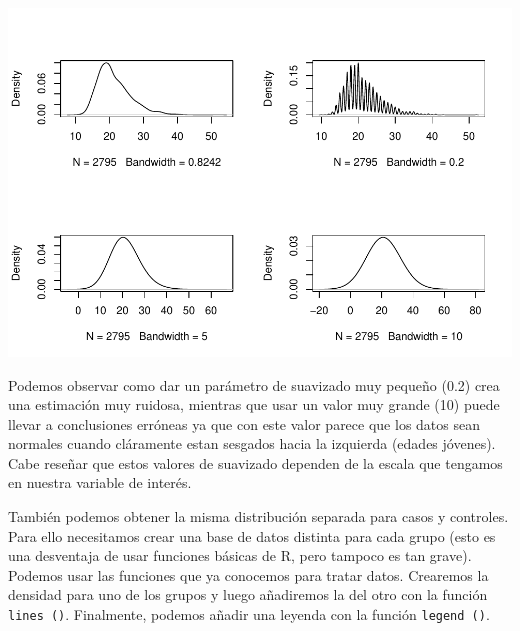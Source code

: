 \documentclass[
]{book}
\begin{document}
\includegraphics{fig/unnamed-chunk-83-1.pdf}

Podemos observar como dar un parámetro de suavizado muy pequeño (0.2) crea una estimación muy ruidosa, mientras que usar un valor muy grande (10) puede llevar a conclusiones erróneas ya que con este valor parece que los datos sean normales cuando cláramente estan sesgados hacia la izquierda (edades jóvenes). Cabe reseñar que estos valores de suavizado dependen de la escala que tengamos en nuestra variable de interés.

También podemos obtener la misma distribución separada para casos y controles. Para ello necesitamos crear una base de datos distinta para cada grupo (esto es una desventaja de usar funciones básicas de R, pero tampoco es tan grave). Podemos usar las funciones que ya conocemos para tratar datos. Crearemos la densidad para uno de los grupos y luego añadiremos la del otro con la función \texttt{lines\ ()}. Finalmente, podemos añadir una leyenda con la función \texttt{legend\ ()}.
\end{document}
